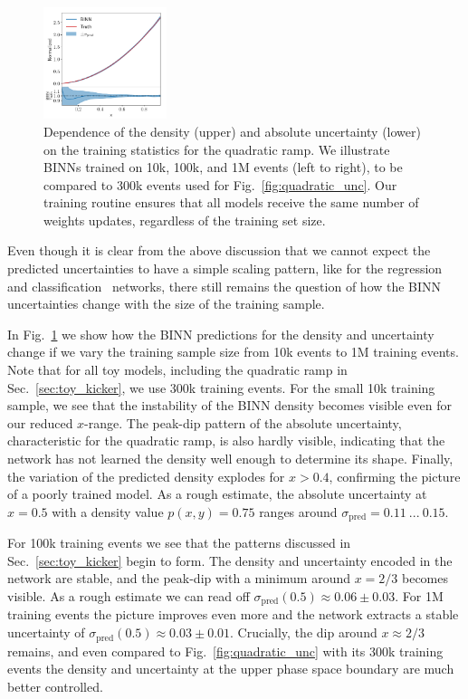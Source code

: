 \begin{figure}[t]
\includegraphics[width=0.32\textwidth, page=2]{./figures/bINN/training_size_1M}
\caption{Dependence of the density (upper) and absolute
  uncertainty (lower) on the training statistics for the quadratic ramp. We illustrate BINNs trained
  on 10k, 100k, and 1M events (left to right), to be compared to 300k
  events used for Fig.~\ref{fig:quadratic_unc}. Our training routine
  ensures that all models receive the same number of weights updates,
  regardless of the training set size.}
\label{fig:training_size}
\end{figure}

Even though it is clear from the above discussion that we cannot
expect the predicted uncertainties to have a simple scaling pattern,
like for the regression~\cite{Kasieczka:2020vlh} and
classification~\cite{Bollweg:2019skg} networks, there still remains
the question of how the BINN uncertainties change with the size of the
training sample.

In Fig.~\ref{fig:training_size} we show how the BINN predictions for
the density and uncertainty change if we vary the training sample size
from 10k events to 1M training events. Note that for all toy
models, including the quadratic ramp in Sec.~\ref{sec:toy_kicker}, we use
300k training events. For the small 10k training sample, we see that
the instability of the BINN density becomes visible even for our
reduced $x$-range.  The peak-dip pattern of the absolute uncertainty,
characteristic for the quadratic ramp, is also hardly visible, indicating
that the network has not learned the density well enough to determine
its shape. Finally, the variation of the predicted density explodes
for $x>0.4$, confirming the picture of a poorly trained model. As a
rough estimate, the absolute uncertainty at $x=0.5$ with a density
value $p(x,y) = 0.75$ ranges around $\sigma_\text{pred} =
0.11~...~0.15$.

For 100k training events we see that the patterns discussed in
Sec.~\ref{sec:toy_kicker} begin to form. The density and uncertainty
encoded in the network are stable, and the peak-dip with a minimum
around $x=2/3$ becomes visible. As a rough estimate we can read off
$\sigma_\text{pred}(0.5) \approx 0.06 \pm 0.03$. For 1M training
events the picture improves even more and the network extracts a
stable uncertainty of $\sigma_\text{pred}(0.5) \approx 0.03 \pm
0.01$. Crucially, the dip around $x \approx 2/3$ remains, and even
compared to Fig.~\ref{fig:quadratic_unc} with its 300k training events
the density and uncertainty at the upper phase space boundary are much
better controlled.

